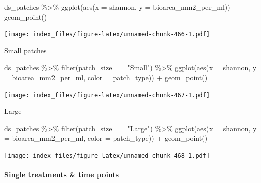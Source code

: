 \documentclass[
]{article}
\newenvironment{Shaded}{\begin{snugshade}}{\end{snugshade}}
\newcommand{\AttributeTok}[1]{\textcolor[rgb]{0.77,0.63,0.00}{#1}}
\newcommand{\FunctionTok}[1]{\textcolor[rgb]{0.00,0.00,0.00}{#1}}
\newcommand{\NormalTok}[1]{#1}
\newcommand{\SpecialCharTok}[1]{\textcolor[rgb]{0.00,0.00,0.00}{#1}}
\newcommand{\StringTok}[1]{\textcolor[rgb]{0.31,0.60,0.02}{#1}}
\begin{document}
\begin{Shaded}
\begin{Highlighting}[]
\NormalTok{ds\_patches }\SpecialCharTok{\%\textgreater{}\%}
  \FunctionTok{ggplot}\NormalTok{(}\FunctionTok{aes}\NormalTok{(}\AttributeTok{x =}\NormalTok{ shannon,}
             \AttributeTok{y =}\NormalTok{ bioarea\_mm2\_per\_ml)) }\SpecialCharTok{+}
  \FunctionTok{geom\_point}\NormalTok{()}
\end{Highlighting}
\end{Shaded}

\texttt{[image: index\_files/figure-latex/unnamed-chunk-466-1.pdf]}

Small patches

\begin{Shaded}
\begin{Highlighting}[]
\NormalTok{ds\_patches }\SpecialCharTok{\%\textgreater{}\%}
  \FunctionTok{filter}\NormalTok{(patch\_size }\SpecialCharTok{==} \StringTok{"Small"}\NormalTok{) }\SpecialCharTok{\%\textgreater{}\%}
  \FunctionTok{ggplot}\NormalTok{(}\FunctionTok{aes}\NormalTok{(}\AttributeTok{x =}\NormalTok{ shannon,}
             \AttributeTok{y =}\NormalTok{ bioarea\_mm2\_per\_ml,}
             \AttributeTok{color =}\NormalTok{ patch\_type)) }\SpecialCharTok{+}
  \FunctionTok{geom\_point}\NormalTok{()}
\end{Highlighting}
\end{Shaded}

\texttt{[image: index\_files/figure-latex/unnamed-chunk-467-1.pdf]}

Large

\begin{Shaded}
\begin{Highlighting}[]
\NormalTok{ds\_patches }\SpecialCharTok{\%\textgreater{}\%}
  \FunctionTok{filter}\NormalTok{(patch\_size }\SpecialCharTok{==} \StringTok{"Large"}\NormalTok{) }\SpecialCharTok{\%\textgreater{}\%}
  \FunctionTok{ggplot}\NormalTok{(}\FunctionTok{aes}\NormalTok{(}\AttributeTok{x =}\NormalTok{ shannon,}
             \AttributeTok{y =}\NormalTok{ bioarea\_mm2\_per\_ml,}
             \AttributeTok{color =}\NormalTok{ patch\_type)) }\SpecialCharTok{+}
  \FunctionTok{geom\_point}\NormalTok{()}
\end{Highlighting}
\end{Shaded}

\texttt{[image: index\_files/figure-latex/unnamed-chunk-468-1.pdf]}

\hypertarget{single-treatments-time-points-1}{%
\paragraph{Single treatments \& time
points}\label{single-treatments-time-points-1}}
\end{document}
